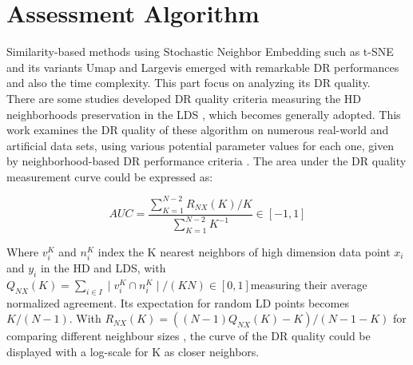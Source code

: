 \chapter{Assessment Algorithm}

Similarity-based methods using Stochastic Neighbor Embedding such as t-SNE and its variants Umap and Largevis emerged with remarkable DR performances and also the time complexity. This part focus on analyzing its DR quality. \\

\noindent There are some studies developed DR quality criteria measuring the HD neighborhoods preservation in the LDS \cite{ref10}, which becomes generally adopted. This work examines the DR quality of these algorithm on numerous real-world and artificial data sets\cite{ref8}, using various potential parameter values for each one, given by neighborhood-based DR performance criteria \cite{ref9}. The area under the DR quality measurement curve could be expressed as:

\begin{equation*}
    AUC  = \frac{ \sum_{K=1}^{N-2} R_{NX}(K)/K}{\sum_{K=1}^{N-2}K^{-1}}   \in [-1,1]
\end{equation*}

\noindent Where $v^K_i$ and $n^K_i$ index the K nearest neighbors of high dimension data point $x_i$ and $y_i$ in the HD and LDS, with $Q_{NX} (K) = \sum_{i \in I} \mid v^K_i \cap n^K_i \mid / (KN) \in [0, 1] $measuring their average normalized agreement\cite{ref8}. Its expectation for random LD points becomes $K/ (N − 1)$. With $R_{NX} (K) = ((N − 1)Q_{NX} (K) − K) /(N − 1 − K)$ for comparing different neighbour sizes \cite{ref11}, the curve of the DR quality could be displayed with a log-scale for K as closer neighbors. \\ 